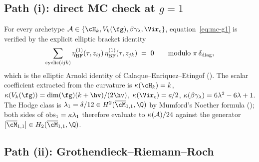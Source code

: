 \subsection{Path (i): direct MC check at $g=1$}

\begin{proposition}[$g=1$ direct MC verification;
\ClaimStatusProvedHere]
\label{prop:mc-direct-g1-verification}
For every archetype $\cA\in\{\cH_{k},V_{k}(\fg),\beta\gamma_\lambda,
\Vir_{c}\}$, equation~\eqref{eq:mc-g1} is verified by the explicit
elliptic bracket identity
\begin{equation}\label{eq:mc-verification-direct}
\sum_{\mathrm{cyclic}(ijk)}
\eta^{(1)}_{\mathrm{BF}}(\tau,z_{ij})\,
\eta^{(1)}_{\mathrm{BF}}(\tau,z_{jk})
\;=\;
0
\qquad \textup{modulo } \pi\,\delta_{\mathrm{diag}},
\end{equation}
which is the elliptic Arnold identity of Calaque--Enriquez--Etingof
\textup{(}\cite[Section~4]{CEE10}\textup{)}. The scalar coefficient
extracted from the curvature is
$\kscal(\cH_{k})=k$,
$\kscal(V_{k}(\fg))=\dim(\fg)(k+\hv)/(2\hv)$,
$\kscal(\Vir_{c})=c/2$,
$\kappa(\beta\gamma_\lambda)=6\lambda^{2}-6\lambda+1$.
The Hodge class is $\lambda_{1}=\delta/12\in H^{2}(\overline{\cM}_{1,1},\Q)$
by Mumford's Noether formula \textup{(}\cite{Mumford83}\textup{)};
both sides of $\mathrm{obs}_{1}=\kappa\lambda_{1}$ therefore evaluate
to $\kappa(\mathcal{A})/24$ against the generator
$[\overline{\cM}_{1,1}]\in H_{2}(\overline{\cM}_{1,1},\Q)$.
\end{proposition}

\subsection{Path (ii): Grothendieck--Riemann--Roch}

